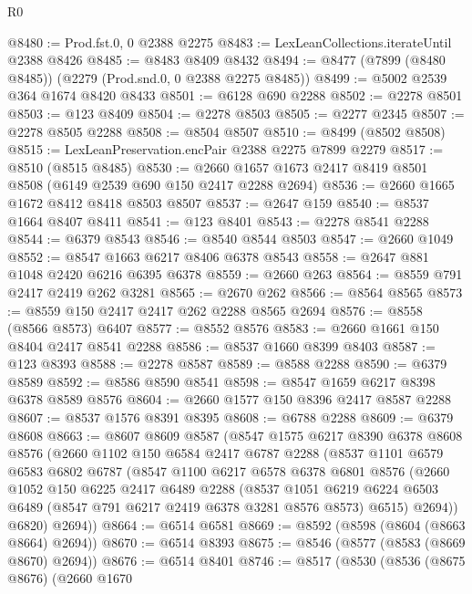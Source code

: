 \begin{lexlean}{R0}
\begin{coremodule}
@8480 := Prod.fst.{0, 0} @2388 @2275
@8483 := LexLeanCollections.iterateUntil @2388 @8426
@8485 := @8483 @8409 @8432
@8494 := @8477 (@7899 (@8480 @8485)) (@2279 (Prod.snd.{0, 0} @2388 @2275 @8485))
@8499 := @5002 @2539 @364 @1674 @8420 @8433
@8501 := @6128 @690 @2288
@8502 := @2278 @8501
@8503 := @123 @8409
@8504 := @2278 @8503
@8505 := @2277 @2345
@8507 := @2278 @8505 @2288
@8508 := @8504 @8507
@8510 := @8499 (@8502 @8508)
@8515 := LexLeanPreservation.encPair @2388 @2275 @7899 @2279
@8517 := @8510 (@8515 @8485)
@8530 := @2660 @1657 @1673 @2417 @8419 @8501 @8508 (@6149 @2539 @690 @150 @2417 @2288 @2694)
@8536 := @2660 @1665 @1672 @8412 @8418 @8503 @8507
@8537 := @2647 @159
@8540 := @8537 @1664 @8407 @8411
@8541 := @123 @8401
@8543 := @2278 @8541 @2288
@8544 := @6379 @8543
@8546 := @8540 @8544 @8503
@8547 := @2660 @1049
@8552 := @8547 @1663 @6217 @8406 @6378 @8543
@8558 := @2647 @881 @1048 @2420 @6216 @6395 @6378
@8559 := @2660 @263
@8564 := @8559 @791 @2417 @2419 @262 @3281
@8565 := @2670 @262
@8566 := @8564 @8565
@8573 := @8559 @150 @2417 @2417 @262 @2288 @8565 @2694
@8576 := @8558 (@8566 @8573) @6407
@8577 := @8552 @8576
@8583 := @2660 @1661 @150 @8404 @2417 @8541 @2288
@8586 := @8537 @1660 @8399 @8403
@8587 := @123 @8393
@8588 := @2278 @8587
@8589 := @8588 @2288
@8590 := @6379 @8589
@8592 := @8586 @8590 @8541
@8598 := @8547 @1659 @6217 @8398 @6378 @8589 @8576
@8604 := @2660 @1577 @150 @8396 @2417 @8587 @2288
@8607 := @8537 @1576 @8391 @8395
@8608 := @6788 @2288
@8609 := @6379 @8608
@8663 := @8607
    @8609
    @8587
    (@8547
      @1575
      @6217
      @8390
      @6378
      @8608
      @8576
      (@2660
        @1102
        @150
        @6584
        @2417
        @6787
        @2288
        (@8537
          @1101
          @6579
          @6583
          @6802
          @6787
          (@8547
            @1100
            @6217
            @6578
            @6378
            @6801
            @8576
            (@2660
              @1052
              @150
              @6225
              @2417
              @6489
              @2288
              (@8537
                @1051
                @6219
                @6224
                @6503
                @6489
                (@8547 @791 @6217 @2419 @6378 @3281 @8576 @8573)
                @6515)
              @2694))
          @6820)
        @2694))
@8664 := @6514 @6581
@8669 := @8592 (@8598 (@8604 (@8663 @8664) @2694))
@8670 := @6514 @8393
@8675 := @8546 (@8577 (@8583 (@8669 @8670) @2694))
@8676 := @6514 @8401
@8746 := @8517
    (@8530
      (@8536
        (@8675 @8676)
        (@2660
          @1670

\end{coremodule}
\end{lexlean}
